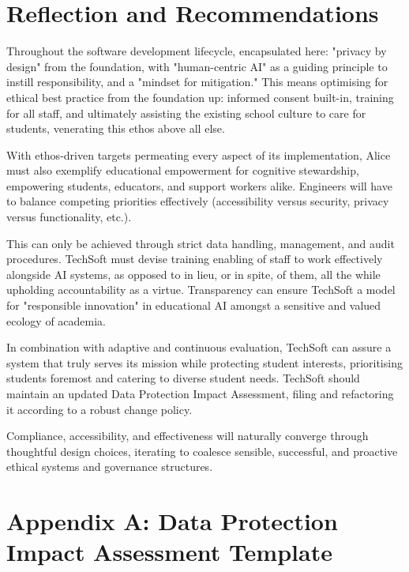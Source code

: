 \documentclass[14pt,a4paper]{article}
\begin{document}
\section{Reflection and Recommendations}
Throughout the software development lifecycle, encapsulated here: "privacy by design" from the foundation, with "human-centric AI" as a guiding principle to instill responsibility, and a "mindset for mitigation."
This means optimising for ethical best practice from the foundation up: informed consent built-in, training for all staff, and ultimately assisting the existing school culture to care for students, venerating this ethos above all else.

With ethos-driven targets permeating every aspect of its implementation, Alice must also exemplify educational empowerment for cognitive stewardship, empowering students, educators, and support workers alike. Engineers will have to balance competing priorities effectively (accessibility versus security, privacy versus functionality, etc.).

This can only be achieved through strict data handling, management, and audit procedures. TechSoft must devise training enabling of staff to work effectively alongside AI systems, as opposed to in lieu, or in spite, of them, all the while upholding accountability as a virtue.
Transparency can ensure TechSoft a model for "responsible innovation" in educational AI amongst a sensitive and valued ecology of academia.

In combination with adaptive and continuous evaluation, TechSoft can assure a system that truly serves its mission while protecting student interests, prioritising students foremost and catering to diverse student needs.
TechSoft should maintain an updated Data Protection Impact Assessment, filing and refactoring it according to a robust change policy.

Compliance, accessibility, and effectiveness will naturally converge through thoughtful design choices, iterating to coalesce sensible, successful, and proactive ethical systems and governance structures.



\newpage
\appendix
\section{Appendix A: Data Protection Impact Assessment Template}\label{appendix:a}
\end{document}

